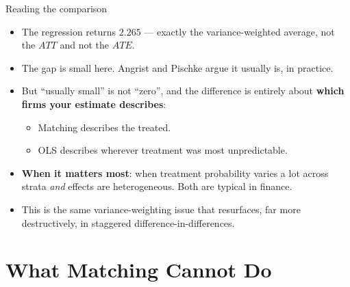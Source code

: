 \documentclass[
  11pt,
  ignorenonframetext,
  aspectratio=169,
]{beamer}
\providecommand{\tightlist}{%
  \setlength{\itemsep}{0pt}\setlength{\parskip}{0pt}}
\begin{document}
\begin{frame}{Reading the comparison}
\protect{}\label{reading-the-comparison}
\begin{itemize}
\tightlist
\item
  The regression returns \(2.265\) --- exactly the variance-weighted
  average, not the \(ATT\) and not the \(ATE\).
\item
  The gap is small here. Angrist and Pischke argue it usually is, in
  practice.
\item
  But ``usually small'' is not ``zero'', and the difference is entirely
  about \textbf{which firms your estimate describes}:

  \begin{itemize}
  \tightlist
  \item
    Matching describes the treated.
  \item
    OLS describes wherever treatment was most unpredictable.
  \end{itemize}
\item
  \textbf{When it matters most}: when treatment probability varies a lot
  across strata \emph{and} effects are heterogeneous. Both are typical
  in finance.
\item
  This is the same variance-weighting issue that resurfaces, far more
  destructively, in staggered difference-in-differences.
\end{itemize}
\end{frame}

\section{What Matching Cannot Do}\label{what-matching-cannot-do}
\end{document}
